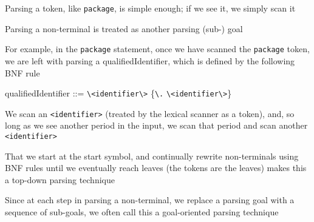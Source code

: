 \documentclass[8pt,a4paper,compress,handout]{beamer}
\newenvironment{spaced}
{
\smallskip
\hspace{.5cm}
\begin{minipage}[c]{\textwidth}
}
{
\end{minipage}
\smallskip
}
\begin{document}
\begin{frame}[fragile]
\pause

Parsing a token, like \lstinline{package}, is simple enough; if we see it, we simply scan it

\pause
\bigskip

Parsing a non-terminal is treated as another parsing (sub-) goal

\pause
\bigskip

For example, in the \lstinline{package} statement, once we have scanned the \lstinline{package} token, we are left with parsing a qualifiedIdentifier, which is defined by the following BNF rule

\text{ }
\begin{spaced}
\begin{production}
qualifiedIdentifier ::= \lstinline{\<identifier\>} \{\lstinline{\.} \lstinline{\<identifier\>}\}
\end{production}
\end{spaced}

\pause

We scan an \lstinline{<identifier>} (treated by the lexical scanner as a token), and, so long as we see another period in the input, we scan that period and scan another \lstinline{<identifier>}

\pause
\bigskip

That we start at the start symbol, and continually rewrite non-terminals using BNF rules until we eventually reach leaves (the tokens are the leaves) makes this a top-down parsing technique

\pause
\bigskip

Since at each step in parsing a non-terminal, we replace a parsing goal with a sequence of sub-goals, we often call this a goal-oriented parsing technique
\end{frame}
\end{document}
